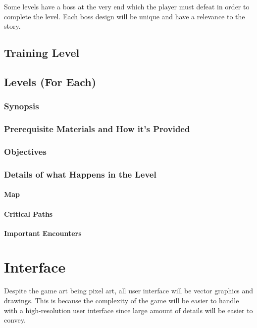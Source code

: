 \documentclass[12pt]{article}
\begin{document}
Some levels have a boss at the very end which the player must defeat in order to complete the level. Each boss design will be unique and have a relevance to the story. 

\subsection{Training Level}

\subsection{Levels (For Each)}

\subsubsection{Synopsis}

\subsubsection{Prerequisite Materials and How it's Provided}

\subsubsection{Objectives}

\subsubsection{Details of what Happens in the Level}

\paragraph{Map}

\paragraph{Critical Paths}

\paragraph{Important Encounters}

\section{Interface}

Despite the game art being pixel art, all user interface will be vector graphics and drawings. This is because the complexity of the game will be easier to handle with a high-resolution user interface since large amount of details will be easier to convey. 
\end{document}
